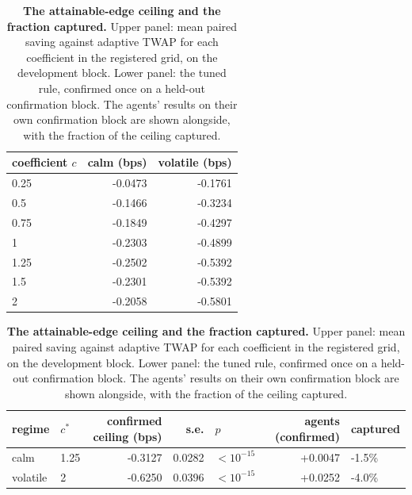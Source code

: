 \begin{table}[htbp]\centering
\caption[The attainable-edge ceiling]{\textbf{The attainable-edge ceiling and the fraction
captured.} Upper panel: mean paired saving against adaptive TWAP for each coefficient in the
registered grid, on the development block. Lower panel: the tuned rule, confirmed once on a
held-out confirmation block. The agents' results on their own confirmation block are shown
alongside, with the fraction of the ceiling captured.}
\label{tab:sigext-ceiling}
\small
\begin{tabular}{lrr}
\toprule
coefficient $c$ & calm (bps) & volatile (bps) \\
\midrule
0.25 & -0.0473 & -0.1761 \\
0.5 & -0.1466 & -0.3234 \\
0.75 & -0.1849 & -0.4297 \\
1 & -0.2303 & -0.4899 \\
1.25 & -0.2502 & -0.5392 \\
1.5 & -0.2301 & -0.5392 \\
2 & -0.2058 & -0.5801 \\
\bottomrule
\end{tabular}

\vspace{0.6em}
\begin{tabular}{llrrlrl}
\toprule
regime & $c^*$ & confirmed ceiling (bps) & s.e. & $p$ & agents (confirmed) & captured \\
\midrule
calm & 1.25 & -0.3127 & 0.0282 & $<10^{-15}$ & +0.0047 & -1.5\% \\
volatile & 2 & -0.6250 & 0.0396 & $<10^{-15}$ & +0.0252 & -4.0\% \\
\bottomrule
\end{tabular}
\end{table}
